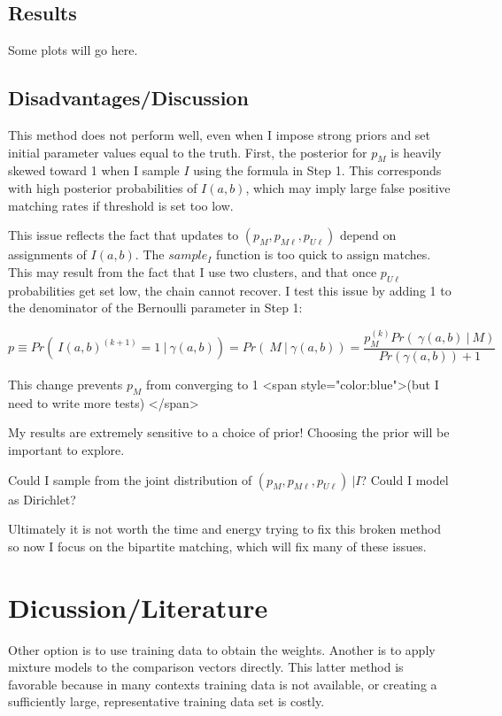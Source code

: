 \documentclass[11pt,reqno]{amsart}
\begin{document}
\subsection{Results} Some plots will go here. 

\subsection{Disadvantages/Discussion}

This method does not perform well, even when I impose strong priors and set initial parameter values equal to the truth.   First, the posterior for $p_M$ is heavily skewed toward 1 when I sample $I$ using the formula in Step 1.  This corresponds with high posterior probabilities of $I(a,b)$, which may imply large false positive matching rates if threshold is set too low. 

This issue reflects the fact that updates to $(p_M, p_{M\ell}, p_{U\ell})$ depend on assignments of $I(a,b)$. The $sample_I$ function is too quick to assign matches.  This may result from the fact that I use two clusters, and that once $p_{U\ell}$ probabilities get set low, the chain cannot recover.  I test this issue by adding 1 to the denominator of the Bernoulli parameter in Step 1:

$$p \equiv Pr(\ I(a,b)^{(k+1)}=1\ |\ \gamma(a,b)) = Pr(\ M\  |\  \gamma(a,b)) = \frac{p_M^{(k)}Pr(\ \gamma(a,b)\ |\ M)}{Pr(\gamma(a,b)) + 1} $$ 

This change prevents $p_M$ from converging to 1 <span style="color:blue">(but I need to write more tests) </span>

My results are extremely sensitive to a choice of prior! Choosing the prior will be important to explore. 

Could I sample from the joint distribution of $(p_M, p_{M\ell}, p_{U\ell})\ | I$?  Could I model as Dirichlet?

Ultimately it is not worth the time and energy trying to fix this broken method so now I focus on the bipartite matching, which will fix many of these issues.


\section{Dicussion/Literature}

Other option is to use training data to obtain the weights.  Another is to apply mixture models to the comparison vectors directly.  This latter method is favorable because in many contexts training data is not available, or creating a sufficiently large, representative training data set is costly.  
\end{document}
